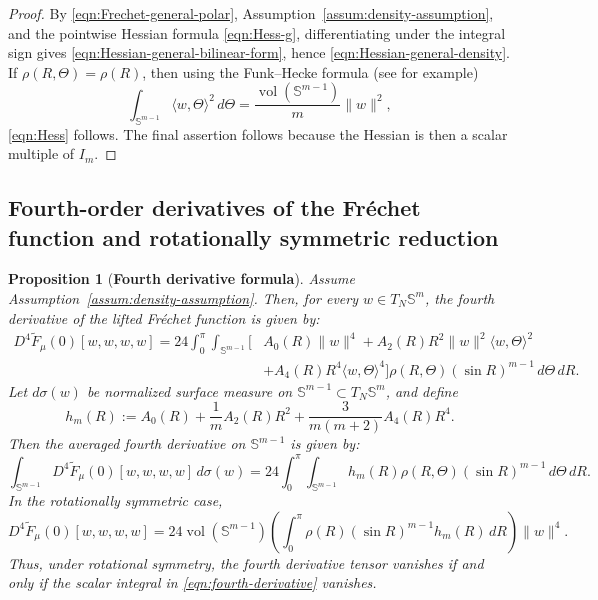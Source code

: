 \documentclass{amsart}
\newtheorem{proposition}[theorem]{Proposition}
\theoremstyle{definition}
\theoremstyle{remark}
\newcommand\0{\boldsymbol{0}}
\begin{document}
\begin{proof}
By \eqref{eqn:Frechet-general-polar}, Assumption~\ref{assum:density-assumption}, and the pointwise Hessian formula \eqref{eqn:Hess-g}, differentiating under the integral sign gives \eqref{eqn:Hessian-general-bilinear-form}, hence \eqref{eqn:Hessian-general-density}.  If \(\rho(R,\Theta)=\rho(R)\), then using the Funk--Hecke formula (see \cite{ChafaiFunkHecke} for example)
\[
    \int_{\mathbb S^{m-1}}\langle w,\Theta\rangle^2\,d\Theta
    =
    \frac{\operatorname{vol}(\mathbb S^{m-1})}{m}\|w\|^2,
\]
 \eqref{eqn:Hess} follows.  The final assertion follows because the Hessian is then a scalar multiple of \(I_m\).
\end{proof}

\subsection{Fourth-order derivatives of the Fréchet function and rotationally symmetric reduction}
\label{para:fourth-derivative-general-density}

\begin{proposition}[\textbf{Fourth derivative formula}]
\label{prop:fourth-common}
\label{prop:Hess-fourth-Fréchet-rot-symm}
\label{prop:Hess-fourth-Frechet-rot-symm}
Assume Assumption~\ref{assum:density-assumption}.  Then, for every \(w\in T_N\mathbb S^m\), the fourth derivative of the lifted Fréchet function is given by:
\begin{equation}
\label{eqn:fourth-derivative-general-density}
\boxed{
\begin{aligned}
    D^4\widetilde F_\mu(0)[w,w,w,w]
    =
    24\int_0^\pi\!\!\int_{\mathbb S^{m-1}}
    \Big[
    &A_0(R)\|w\|^4+
    A_2(R)R^2\|w\|^2\langle w,\Theta\rangle^2 \\
    &+
    A_4(R)R^4\langle w,\Theta\rangle^4
    \Big]
    \rho(R,\Theta)(\sin R)^{m-1}\,d\Theta\,dR .
\end{aligned}}
\end{equation}
Let \(d\sigma(w)\) be \textit{normalized} surface measure on \(\mathbb S^{m-1}\subset T_N\mathbb S^m\), and define
\begin{equation}
\label{eqn:h}
    h_m(R):=
    A_0(R)+\frac{1}{m}A_2(R)R^2+\frac{3}{m(m+2)}A_4(R)R^4 .
\end{equation}
Then the averaged fourth derivative on $\mathbb S^{m-1}$ is given by:
\begin{equation}
\label{eqn:averaged-fourth-derivative-general-density}
\boxed{
    \int_{\mathbb S^{m-1}}D^4\widetilde F_\mu(0)[w,w,w,w]\,d\sigma(w)
    =
    24\int_0^\pi\!\!\int_{\mathbb S^{m-1}}
    h_m(R)\rho(R,\Theta)(\sin R)^{m-1}\,d\Theta\,dR .
}
\end{equation}
In the rotationally symmetric case,
\begin{equation}
\label{eqn:fourth-derivative}
\boxed{
    D^4\widetilde F_\mu(0)[w,w,w,w]
    =
    24\operatorname{vol}(\mathbb S^{m-1})
    \left(\int_0^\pi \rho(R)(\sin R)^{m-1}h_m(R)\,dR\right)\|w\|^4 .
}
\end{equation}
Thus, under rotational symmetry, the fourth derivative tensor vanishes if and only if the scalar integral in \eqref{eqn:fourth-derivative} vanishes.
\end{proposition}
\end{document}
